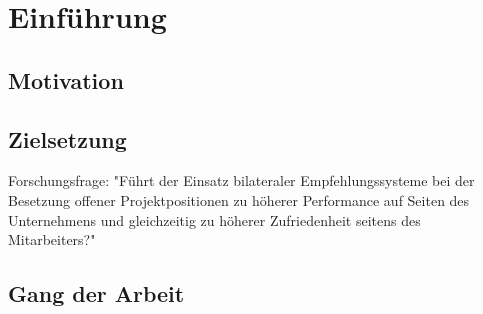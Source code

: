 \chapter{Einführung}
\label{ch:intro}

\section{Motivation}
\label{sec:intro:motivation}

\section{Zielsetzung}
\label{sec:intro:zielsetzung}
Forschungsfrage: "Führt der Einsatz bilateraler Empfehlungssysteme bei der Besetzung offener Projektpositionen zu höherer Performance auf Seiten des Unternehmens und gleichzeitig zu höherer Zufriedenheit seitens des Mitarbeiters?"

\section{Gang der Arbeit}
\label{sec:intro:gangDerArbeit}

